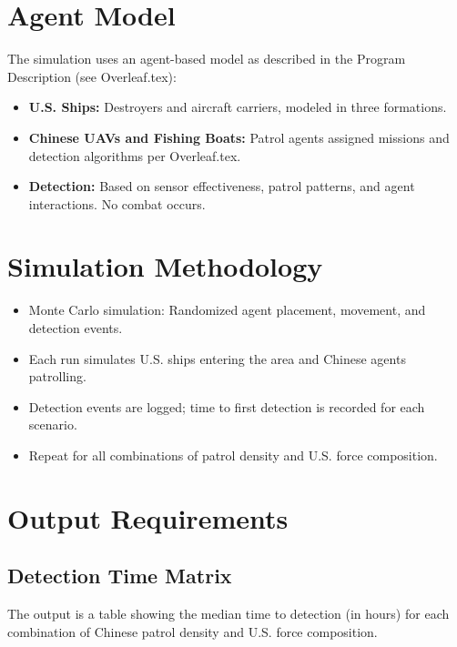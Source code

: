 \documentclass[12pt]{article}
\begin{document}
\section{Agent Model}
The simulation uses an agent-based model as described in the Program Description (see Overleaf.tex):
\begin{itemize}
	\item \textbf{U.S. Ships:} Destroyers and aircraft carriers, modeled in three formations.
	\item \textbf{Chinese UAVs and Fishing Boats:} Patrol agents assigned missions and detection algorithms per Overleaf.tex.
	\item \textbf{Detection:} Based on sensor effectiveness, patrol patterns, and agent interactions. No combat occurs.
\end{itemize}

\section{Simulation Methodology}
\begin{itemize}
	\item Monte Carlo simulation: Randomized agent placement, movement, and detection events.
	\item Each run simulates U.S. ships entering the area and Chinese agents patrolling.
	\item Detection events are logged; time to first detection is recorded for each scenario.
	\item Repeat for all combinations of patrol density and U.S. force composition.
\end{itemize}

\section{Output Requirements}
\subsection{Detection Time Matrix}
The output is a table showing the median time to detection (in hours) for each combination of Chinese patrol density and U.S. force composition.
\end{document}
